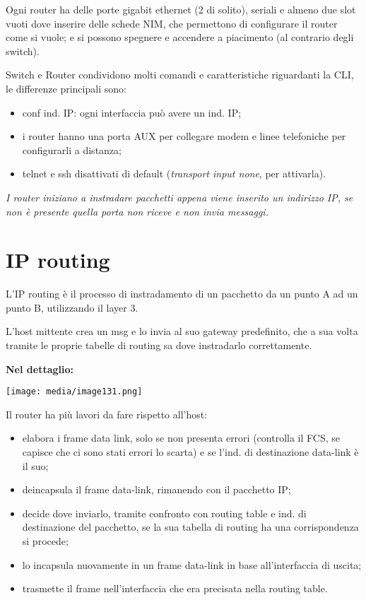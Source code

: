 Ogni router ha delle porte gigabit ethernet (2 di solito), seriali e
almeno due slot vuoti dove inserire delle schede NIM, che permettono di
configurare il router come si vuole; e si possono spegnere e accendere a
piacimento (al contrario degli switch).

Switch e Router condividono molti comandi e caratteristiche riguardanti
la CLI, le differenze principali sono:

\begin{itemize}
\item
  conf ind. IP: ogni interfaccia può avere un ind. IP;
\item
  i router hanno una porta AUX per collegare modem e linee telefoniche
  per configurarli a distanza;
\item
  telnet e ssh disattivati di default (\emph{transport input none}, per
  attivarla).
\end{itemize}

\emph{I router iniziano a instradare pacchetti appena viene inserito un
indirizzo IP, se non è presente quella porta non riceve e non invia
messaggi.}

\section{IP routing}\label{ip-routing-1}

L'IP routing è il processo di instradamento di un pacchetto da un punto
A ad un punto B, utilizzando il layer 3.

L'host mittente crea un msg e lo invia al suo gateway predefinito, che a
sua volta tramite le proprie tabelle di routing sa dove instradarlo
correttamente.

\textbf{Nel dettaglio:}

\texttt{[image: media/image131.png]}

Il router ha più lavori da fare rispetto all'host:

\begin{itemize}
\item
  elabora i frame data link, solo se non presenta errori (controlla il
  FCS, se capisce che ci sono stati errori lo scarta) e se l'ind. di
  destinazione data-link è il suo;
\item
  deincapsula il frame data-link, rimanendo con il pacchetto IP;
\item
  decide dove inviarlo, tramite confronto con routing table e ind. di
  destinazione del pacchetto, se la sua tabella di routing ha una
  corrispondenza si procede;
\item
  lo incapsula nuovamente in un frame data-link in base all'interfaccia
  di uscita;
\item
  trasmette il frame nell'interfaccia che era precisata nella routing
  table.
\end{itemize}

